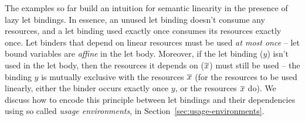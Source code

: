 \documentclass[acmsmall,review]{acmart}
\newcommand{\parawith}[1]{\paragraph{\emph{#1}}}
\begin{document}
The examples so far build an intuition for semantic linearity in the presence
of lazy let bindings. In essence, an unused let binding doesn't consume any
resources, and a let binding used exactly once consumes its resources exactly
once. Let binders that depend on linear resources must be used \emph{at most
once} -- let bound variables are \emph{affine} in the let body.
%
Moreover, if the let binding ($y$) isn't used in the let body, then the
resources it depends on ($\overline{x}$) must still be used -- the binding $y$ is
mutually exclusive with the resources $\overline{x}$ (for the resources to be used
linearly, either the binder occurs exactly once $y$, or the resources $\overline{x}$
do). We discuss how to encode this principle between let bindings and their dependencies using so called \emph{usage
environments}, in Section~\ref{sec:usage-environments}.

\end{document}
